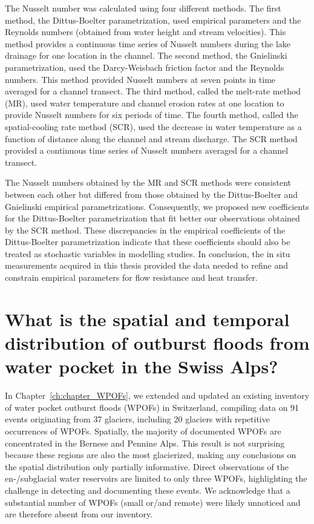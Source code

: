 The Nusselt number was calculated using four different methods. The first method, the Dittus-Boelter parametrization, used empirical parameters and the Reynolds numbers (obtained from water height and stream velocities). This method provides a continuous time series of Nusselt numbers during the lake drainage for one location in the channel. The second method, the Gnielinski parametrization, used the Darcy-Weisbach friction factor and the Reynolds numbers. This method provided Nusselt numbers at seven points in time averaged for a channel transect. The third method, called the melt-rate method (MR), used water temperature and channel erosion rates at one location to provide Nusselt numbers for six periods of time. The fourth method, called the spatial-cooling rate method (SCR), used the decrease in water temperature as a function of distance along the channel and stream discharge. The SCR method provided a continuous time series of Nusselt numbers averaged for a channel transect.
%

The Nusselt numbers obtained by the MR and SCR methods were consistent between each other but differed from those obtained by the Dittus-Boelter and Gnielinski empirical parametrizations. Consequently, we proposed new coefficients for the Dittus-Boelter parametrization that fit better our observations obtained by the SCR method. These discrepancies in the empirical coefficients of the Dittus-Boelter parametrization indicate that these coefficients should also be treated as stochastic variables in modelling studies. In conclusion, the in situ measurements acquired in this thesis provided the data needed to refine and constrain empirical parameters for flow resistance and heat transfer. 


\section{What is the spatial and temporal distribution of outburst floods from water pocket in the Swiss Alps?}

In Chapter~\ref{ch:chapter_WPOFs}, we extended and updated an existing inventory of water pocket outburst floods (WPOFs) in Switzerland, compiling data on 91 events originating from 37 glaciers, including 20 glaciers with repetitive occurrences of WPOFs. Spatially, the majority of documented WPOFs are concentrated in the Bernese and Pennine Alps. This result is not surprising because these regions are also the most glacierized, making any conclusions on the spatial distribution only partially informative. Direct observations of the en-/subglacial water reservoirs are limited to only three WPOFs, highlighting the challenge in detecting and documenting these events. We acknowledge that a substantial number of WPOFs (small or/and remote) were likely unnoticed and are therefore absent from our inventory. 
%

